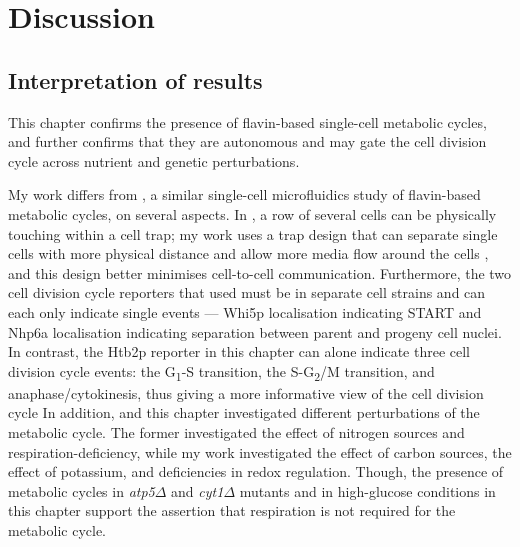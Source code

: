 \section{Discussion}
\label{sec:biology-discussion}

\subsection{Interpretation of results}
\label{subsec:biology-discussion-interpretation}

This chapter confirms the presence of flavin-based single-cell metabolic cycles, and further confirms that they are autonomous and may gate the cell division cycle across nutrient and genetic perturbations.

My work differs from \textcite{baumgartnerFlavinbasedMetabolicCycles2018}, a similar single-cell microfluidics study of flavin-based metabolic cycles, on several aspects.
In \textcite{baumgartnerFlavinbasedMetabolicCycles2018}, a row of several cells can be physically touching within a cell trap; my work uses a trap design that can separate single cells with more physical distance and allow more media flow around the cells \parencite{craneMicrofluidicSystemStudying2014}, and this design better minimises cell-to-cell communication.
Furthermore, the two cell division cycle reporters that \textcite{baumgartnerFlavinbasedMetabolicCycles2018} used must be in separate cell strains and can each only indicate single events --- Whi5p localisation indicating START and Nhp6a localisation indicating separation between parent and progeny cell nuclei.
In contrast, the Htb2p reporter in this chapter can alone indicate three cell division cycle events: the G\textsubscript{1}-S transition, the S-G\textsubscript{2}/M transition, and anaphase/cytokinesis, thus giving a more informative view of the cell division cycle \parencite{garmendia-torresMultipleInputsEnsure2018}
In addition, \textcite{baumgartnerFlavinbasedMetabolicCycles2018} and this chapter investigated different perturbations of the metabolic cycle.
The former investigated the effect of nitrogen sources and respiration-deficiency, while my work investigated the effect of carbon sources, the effect of potassium, and deficiencies in redox regulation.
Though, the presence of metabolic cycles in \textit{atp5$\Delta$} and \textit{cyt1$\Delta$} mutants  \parencite{baumgartnerFlavinbasedMetabolicCycles2018} and in high-glucose conditions in this chapter support the assertion that respiration is not required for the metabolic cycle.

